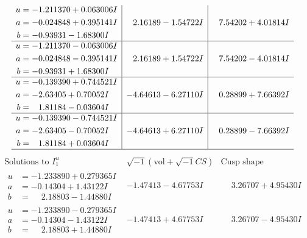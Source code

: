 \documentclass[1p]{elsarticle_modified}
\theoremstyle{definition}
\newcommand{\I}{\sqrt{-1}}
\begin{document}
$$\begin{array}{c|c|c}
\begin{aligned}
u &= -1.211370 + 0.063006 I \\
a &= -0.024848 + 0.395141 I \\
b &= -0.93931 - 1.68300 I\end{aligned}
 & \phantom{-}2.16189 - 1.54722 I & \phantom{-}7.54202 + 4.01814 I \\ \hline\begin{aligned}
u &= -1.211370 - 0.063006 I \\
a &= -0.024848 - 0.395141 I \\
b &= -0.93931 + 1.68300 I\end{aligned}
 & \phantom{-}2.16189 + 1.54722 I & \phantom{-}7.54202 - 4.01814 I \\ \hline\begin{aligned}
u &= -0.139390 + 0.744521 I \\
a &= -2.63405 + 0.70052 I \\
b &= \phantom{-}1.81184 - 0.03604 I\end{aligned}
 & -4.64613 - 6.27110 I & \phantom{-}0.28899 + 7.66392 I \\ \hline\begin{aligned}
u &= -0.139390 - 0.744521 I \\
a &= -2.63405 - 0.70052 I \\
b &= \phantom{-}1.81184 + 0.03604 I\end{aligned}
 & -4.64613 + 6.27110 I & \phantom{-}0.28899 - 7.66392 I\\
 \hline 
 \end{array}$$\newpage$$\begin{array}{c|c|c}  
\text{Solutions to }I^u_{1}& \I (\text{vol} + \sqrt{-1}CS) & \text{Cusp shape}\\
 \hline 
\begin{aligned}
u &= -1.233890 + 0.279365 I \\
a &= -0.14304 + 1.43122 I \\
b &= \phantom{-}2.18803 - 1.44880 I\end{aligned}
 & -1.47413 - 4.67753 I & \phantom{-}3.26707 + 4.95430 I \\ \hline\begin{aligned}
u &= -1.233890 - 0.279365 I \\
a &= -0.14304 - 1.43122 I \\
b &= \phantom{-}2.18803 + 1.44880 I\end{aligned}
 & -1.47413 + 4.67753 I & \phantom{-}3.26707 - 4.95430 I \\ \hline\begin{aligned}

\end{aligned}
\end{array}$$
\end{document}
